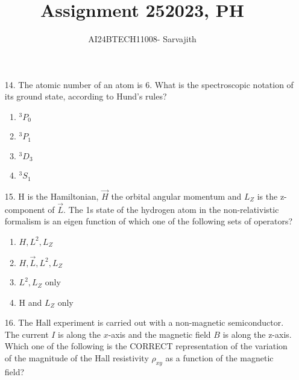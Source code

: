 \documentclass[journal]{IEEEtran}
\begin{document}

\vspace{3cm}


\author{AI24BTECH11008- Sarvajith
}
\title{Assignment 25}
{\let\newpage\relax\maketitle}
\title{2023, PH}
\renewcommand{\thefigure}{\theenumi}
\renewcommand{\thetable}{\theenumi}
\setlength{\intextsep}{10pt} %
\renewcommand{\thetable}{\theenumi}
\begin{enumerate}
    \item[14.] The atomic number of an atom is 6. What is the spectroscopic notation of its
    ground state, according to Hund's rules?
    \begin{enumerate}[label = (\Alph*)]
        \item $^3P_0$
        \item $^3P_1$
        \item $^3D_3$
        \item $^3S_1$
    \end{enumerate}
    \item[15.] H is the Hamiltonian, $\overrightarrow{H}$ the orbital angular momentum and $L_Z$
    is the z-component of $\overrightarrow{L}$. The 1s state of the hydrogen atom in the non-relativistic
    formalism is an eigen function of which one of the following sets of operators?
    \begin{enumerate}[label = (\Alph*)]
        \item $H, L^2, L_Z$
        \item $H,\overrightarrow{L}, L^2, L_Z$
        \item $ L^2, L_Z$ only 
        \item H and $L_Z$ only 
     \end{enumerate} 
    \item[16.] The Hall experiment is carried out with a non-magnetic semiconductor. The
    current $I$ is along the $x$-axis and the magnetic field $B$ is along the z-axis. Which
    one of the following is the CORRECT representation of the variation of the
    magnitude of the Hall resistivity $\rho_{xy}$ as a function of the magnetic field?
    \begin{figure}[!ht]

\end{figure}
\end{enumerate}
\end{document}
